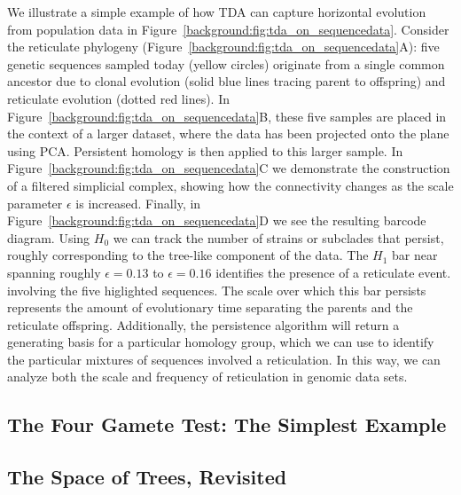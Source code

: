 We illustrate a simple example of how TDA can capture horizontal evolution from population data in Figure~\ref{background:fig:tda_on_sequencedata}.
Consider the reticulate phylogeny (Figure~\ref{background:fig:tda_on_sequencedata}A): five genetic sequences sampled today (yellow circles) originate from a single common ancestor due to clonal evolution (solid blue lines tracing parent to offspring) and reticulate evolution (dotted red lines).
In Figure~\ref{background:fig:tda_on_sequencedata}B, these five samples are placed in the context of a larger dataset, where the data has been projected onto the plane using PCA.
Persistent homology is then applied to this larger sample.
In Figure~\ref{background:fig:tda_on_sequencedata}C we demonstrate the construction of a filtered simplicial complex, showing how the connectivity changes as the scale parameter $\epsilon$ is increased.
Finally, in Figure~\ref{background:fig:tda_on_sequencedata}D we see the resulting barcode diagram.
Using $H_0$ we can track the number of strains or subclades that persist, roughly corresponding to the tree-like component of the data.
The $H_1$ bar near spanning roughly $\epsilon=0.13$ to $\epsilon=0.16$ identifies the presence of a reticulate event. involving the five higlighted sequences.
The scale over which this bar persists represents the amount of evolutionary time separating the parents and the reticulate offspring.
Additionally, the persistence algorithm will return a generating basis for a particular homology group, which we can use to identify the particular mixtures of sequences involved a reticulation.
In this way, we can analyze both the scale and frequency of reticulation in genomic data sets.


\subsection{The Four Gamete Test: The Simplest Example}



\subsection{The Space of Trees, Revisited}

